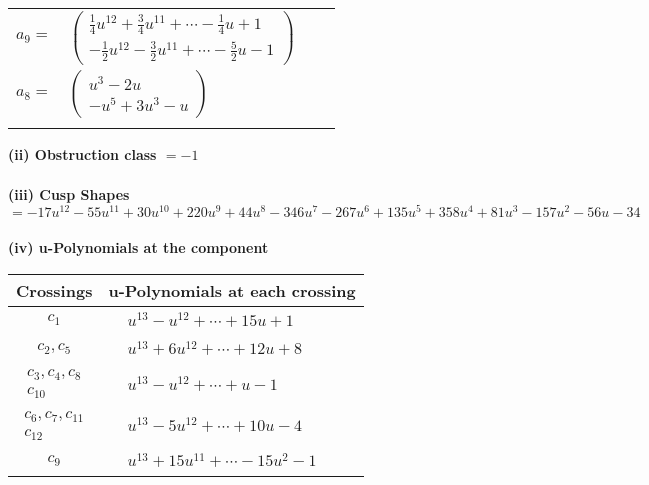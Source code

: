 \documentclass[1p]{elsarticle_modified}
\theoremstyle{definition}
\begin{document}
\begin{tabular}{m{7pt} m{180pt} m{7pt} m{180pt} }
\flushright $a_{9}=$&$\begin{pmatrix}\frac{1}{4} u^{12}+\frac{3}{4} u^{11}+\cdots-\frac{1}{4} u+1\\-\frac{1}{2} u^{12}-\frac{3}{2} u^{11}+\cdots-\frac{5}{2} u-1\end{pmatrix}$ \\
\flushright $a_{8}=$&$\begin{pmatrix}u^3-2 u\\- u^5+3 u^3- u\end{pmatrix}$\\&\end{tabular}
\flushleft \textbf{(ii) Obstruction class $= -1$}\\~\\
\flushleft \textbf{(iii) Cusp Shapes $= -17 u^{12}-55 u^{11}+30 u^{10}+220 u^9+44 u^8-346 u^7-267 u^6+135 u^5+358 u^4+81 u^3-157 u^2-56 u-34$}\\~\\
\newpage\renewcommand{\arraystretch}{1}
\flushleft \textbf{(iv) u-Polynomials at the component}\newline \\
\begin{tabular}{m{50pt}|m{274pt}}
Crossings & \hspace{64pt}u-Polynomials at each crossing \\
\hline $$\begin{aligned}c_{1}\end{aligned}$$&$\begin{aligned}
&u^{13}- u^{12}+\cdots+15 u+1
\end{aligned}$\\
\hline $$\begin{aligned}c_{2},c_{5}\end{aligned}$$&$\begin{aligned}
&u^{13}+6 u^{12}+\cdots+12 u+8
\end{aligned}$\\
\hline $$\begin{aligned}c_{3},c_{4},c_{8}\\c_{10}\end{aligned}$$&$\begin{aligned}
&u^{13}- u^{12}+\cdots+u-1
\end{aligned}$\\
\hline $$\begin{aligned}c_{6},c_{7},c_{11}\\c_{12}\end{aligned}$$&$\begin{aligned}
&u^{13}-5 u^{12}+\cdots+10 u-4
\end{aligned}$\\
\hline $$\begin{aligned}c_{9}\end{aligned}$$&$\begin{aligned}
&u^{13}+15 u^{11}+\cdots-15 u^2-1
\end{aligned}$\\
\hline
\end{tabular}\\~\\
\end{document}
